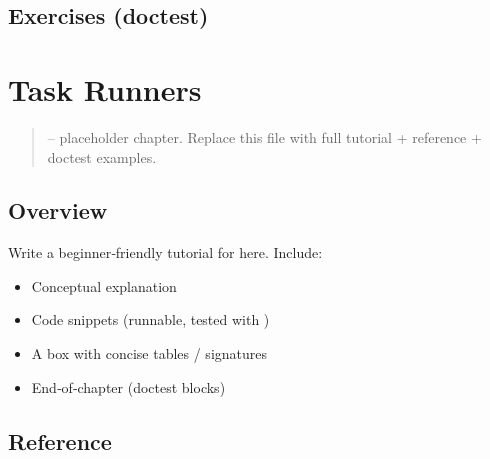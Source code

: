 \documentclass[a4paper,11pt,english]{sphinxmanual}
\begin{document}
\subsection{Exercises (doctest)}
\label{\detokenize{tooling/git_workflow:exercises-doctest}}
\begin{sphinxVerbatim}[commandchars=\\\{\}]
\end{sphinxVerbatim}

\sphinxstepscope


\section{Task Runners}
\label{\detokenize{tooling/task_runners:task-runners}}\label{\detokenize{tooling/task_runners::doc}}\begin{quote}

\sphinxAtStartPar
{} – placeholder chapter. Replace this file with full tutorial + reference + doctest examples.
\end{quote}


\subsection{Overview}
\label{\detokenize{tooling/task_runners:overview}}
\sphinxAtStartPar
Write a beginner‑friendly tutorial for  here. Include:
\begin{itemize}
\item {} 
\sphinxAtStartPar
Conceptual explanation

\item {} 
\sphinxAtStartPar
Code snippets (runnable, tested with )

\item {} 
\sphinxAtStartPar
A  box with concise tables / signatures

\item {} 
\sphinxAtStartPar
End‑of‑chapter  (doctest blocks)

\end{itemize}


\subsection{Reference}
\label{\detokenize{tooling/task_runners:reference}}
\end{document}
